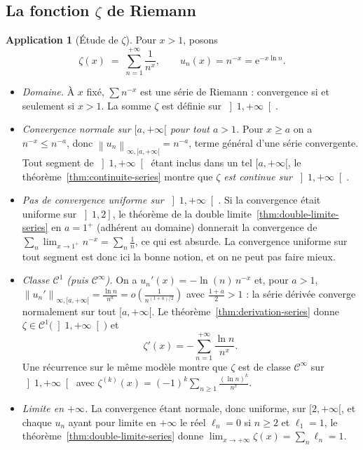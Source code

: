 \documentclass[11pt,a4paper]{article}
\theoremstyle{plain}
\theoremstyle{definition}
\newtheorem{application}[theoreme]{Application}
\theoremstyle{remark}
\newcommand{\Ninf}[2]{\left\lVert #1 \right\rVert_{\infty,#2}}
\numberwithin{equation}{section}
\begin{document}
\subsection{La fonction $\zeta$ de Riemann}

\begin{application}[Étude de $\zeta$]\label{app:zeta}
Pour $x>1$, posons
\[
    \zeta(x) \;=\; \sum_{n=1}^{+\infty} \frac{1}{n^x},
    \qquad u_n(x) = n^{-x} = \mathrm{e}^{-x\ln n} .
\]
\begin{itemize}
    \item \emph{Domaine.} À $x$ fixé, $\sum n^{-x}$ est une série de
    Riemann : convergence si et seulement si $x>1$. La somme $\zeta$ est
    définie sur $\left]1,+\infty\right[$.
    \item \emph{Convergence normale sur $[a,+\infty[$ pour tout $a>1$.}
    Pour
    $x\geq a$ on a $n^{-x}\leq n^{-a}$, donc
    $\Ninf{u_n}{[a,+\infty[} = n^{-a}$, terme général d'une série
    convergente. Tout segment de $\left]1,+\infty\right[$ étant inclus
    dans un tel $[a,+\infty[$, le théorème~\ref{thm:continuite-series}
    montre que \emph{$\zeta$ est continue sur $\left]1,+\infty\right[$}.
    \item \emph{Pas de convergence uniforme sur $\left]1,+\infty\right[$.}
    Si la convergence était uniforme sur $\left]1,2\right]$, le théorème
    de la double limite~\ref{thm:double-limite-series} en $a=1^+$
    (adhérent au domaine) donnerait la convergence de
    $\sum_n \lim_{x\to 1^+} n^{-x} = \sum_n \frac1n$, ce qui est absurde.
    La convergence uniforme \og sur tout segment \fg{} est donc ici la
    bonne notion, et on ne peut pas faire mieux.
    \item \emph{Classe $\mathcal{C}^1$ (puis $\mathcal{C}^\infty$).} On a
    $u_n'(x) = -\ln(n)\,n^{-x}$ et, pour $a>1$,
    $\Ninf{u_n'}{[a,+\infty[} = \frac{\ln n}{n^a}
    = o\!\left(\frac{1}{n^{(1+a)/2}}\right)$ avec $\frac{1+a}{2}>1$ : la
    série dérivée converge normalement sur tout $[a,+\infty[$. Le
    théorème~\ref{thm:derivation-series} donne
    $\zeta\in\mathcal{C}^1\bigl(\left]1,+\infty\right[\bigr)$ et
    \[
        \zeta'(x) = -\sum_{n=1}^{+\infty}\frac{\ln n}{n^x} .
    \]
    Une récurrence sur le même modèle montre que $\zeta$ est de classe
    $\mathcal{C}^\infty$ sur $\left]1,+\infty\right[$ avec
    $\zeta^{(k)}(x) = (-1)^k\sum_{n\geq 1}\frac{(\ln n)^k}{n^x}$.
    \item \emph{Limite en $+\infty$.} La convergence étant normale, donc
    uniforme, sur $[2,+\infty[$, et chaque $u_n$ ayant pour limite en
    $+\infty$ le réel $\ell_n = 0$ si $n\geq 2$ et $\ell_1=1$, le
    théorème~\ref{thm:double-limite-series} donne
    $\lim_{x\to+\infty}\zeta(x) = \sum_n \ell_n = 1$.
\end{itemize}
\end{application}
\end{document}
